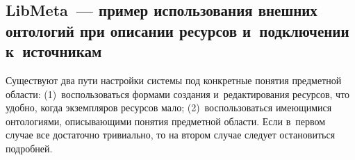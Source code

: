 \begin{multicols}{2}
{}


     
\section{LibMeta~--- пример использования внешних онтологий 
при описании ресурсов и~подключении к~источникам}

    Существуют два пути настройки системы под конкретные понятия 
предметной области: (1)~воспользоваться формами создания 
и~редактирования ресурсов, что удобно, когда экземпляров ресурсов мало; 
(2)~воспользоваться имеющимися онтологиями, описывающими понятия 
предметной области. Если в~первом случае все достаточно тривиально, то на 
втором случае следует остановиться подробней.
{

}
    

\end{multicols}
